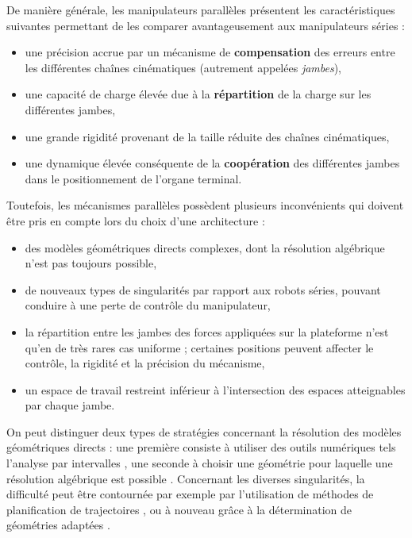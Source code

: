 De manière générale, les manipulateurs parallèles présentent les caractéristi\-ques sui\-vantes permettant de les comparer avantageusement aux manipulateurs séries :
\begin{itemize}
 \item une précision accrue par un mécanisme de {\bf compensation} des erreurs entre les différentes chaînes cinématiques (autrement appelées {\it jambes}),
 \item une capacité de charge élevée due à la {\bf répartition} de la charge sur les différentes jambes,
 \item une grande rigidité provenant de la taille réduite des chaînes cinématiques,
 \item une dynamique élevée conséquente de la {\bf coopération} des différentes jam\-bes dans le positionnement de l'organe terminal.
\end{itemize}

Toutefois, les mécanismes parallèles possèdent plusieurs inconvénients qui doivent être pris en compte lors du choix d'une architecture :
\begin{itemize}
 \item des modèles géométriques directs complexes, dont la résolution algébrique n'est pas toujours possible,
 \item de nouveaux types de singularités par rapport aux robots séries,  pouvant conduire à une perte de contrôle du manipulateur,
 \item la répartition entre les jambes des forces appliquées sur la plateforme n'est qu'en de très rares cas uniforme ; certaines positions peuvent affecter le contrôle, la rigidité et la précision du mécanisme,
 \item un espace de travail restreint inférieur à l'intersection des espaces atteignables par chaque jambe.
\end{itemize}

On peut distinguer deux types de stratégies concernant la résolution des modèles géométriques directs : une première consiste à utiliser des outils numé\-riques tels l'analyse par intervalles \cite{Merlet04solvingthe}, une seconde à choisir une géométrie pour laquelle une résolution algébrique est possible \cite{2003:Krut1}. Concernant les diverses singularités, la difficulté peut être contournée par exemple par l'utilisation de méthodes de planification de trajectoires \cite{2008:Chen.Chi}, \cite{1998:Dasgupta.Mruthyunjaya} ou à nouveau grâce à la détermination de géométries adaptées \cite{w1994:DiCaprioStanisic}.

